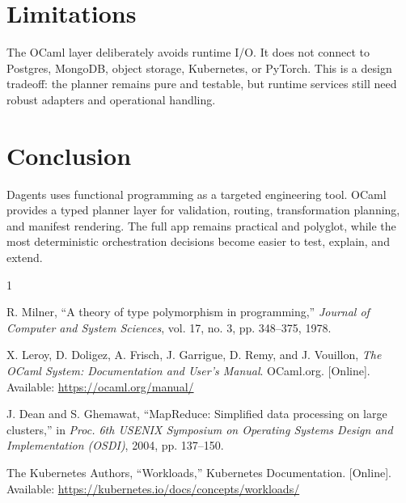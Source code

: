 \documentclass[conference]{IEEEtran}
\begin{document}
\section{Limitations}

The OCaml layer deliberately avoids runtime I/O. It does not connect to
Postgres, MongoDB, object storage, Kubernetes, or PyTorch. This is a design
tradeoff: the planner remains pure and testable, but runtime services still
need robust adapters and operational handling.

\section{Conclusion}

Dagents uses functional programming as a targeted engineering tool. OCaml
provides a typed planner layer for validation, routing, transformation planning,
and manifest rendering. The full app remains practical and polyglot, while the
most deterministic orchestration decisions become easier to test, explain, and
extend.

\begin{thebibliography}{1}

R. Milner, ``A theory of type polymorphism in programming,'' \emph{Journal of
Computer and System Sciences}, vol. 17, no. 3, pp. 348--375, 1978.

X. Leroy, D. Doligez, A. Frisch, J. Garrigue, D. Remy, and J. Vouillon,
\emph{The OCaml System: Documentation and User's Manual}. OCaml.org.
[Online]. Available: \url{https://ocaml.org/manual/}

J. Dean and S. Ghemawat, ``MapReduce: Simplified data processing on large
clusters,'' in \emph{Proc. 6th USENIX Symposium on Operating Systems Design and
Implementation (OSDI)}, 2004, pp. 137--150.

The Kubernetes Authors, ``Workloads,'' Kubernetes Documentation. [Online].
Available: \url{https://kubernetes.io/docs/concepts/workloads/}

\end{thebibliography}
\end{document}
